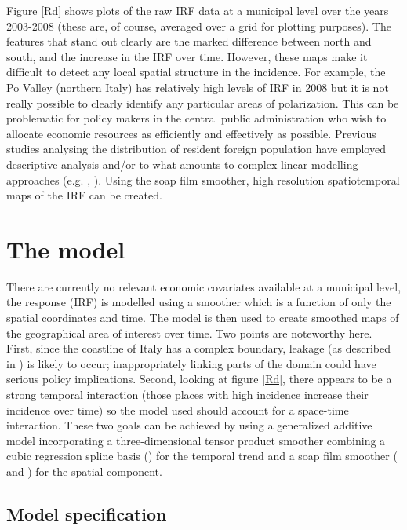 Figure \ref{Rd} shows plots of the raw IRF data at a municipal level over the years 2003-2008 (these are, of course, averaged over a grid for plotting purposes). The features that stand out clearly are the marked difference between north and south, and the increase in the IRF over time. However, these maps make it difficult to detect any local spatial structure in the incidence. For example, the Po Valley (northern Italy) has relatively high levels of IRF in 2008 but it is not really possible to clearly identify any particular areas of polarization. This can be problematic for policy makers in the central public administration who wish to allocate economic resources as efficiently and effectively as possible. Previous studies analysing the distribution of resident foreign population have employed descriptive analysis and/or to what amounts  to complex linear modelling approaches (e.g. \cite{Fonseca2008}, \cite{Longhi2010}). Using the soap film smoother, high resolution spatiotemporal maps of the IRF can be created.


\section{The model \label{METH}}

There are currently no relevant economic covariates available at a municipal level, the response (IRF) is modelled using a smoother which is a function of only the spatial coordinates and time. The model is then used to create smoothed maps of the geographical area of interest over time. Two points are noteworthy here. First, since the coastline of Italy has a complex boundary, leakage (as described in ) is likely to occur; inappropriately linking parts of the domain could have serious policy implications. Second, looking at figure \ref{Rd}, there appears to be a strong temporal interaction (those places with high incidence increase their incidence over time) so the model used should account for a space-time interaction. These two goals can be achieved by using a generalized additive model incorporating a three-dimensional tensor product smoother combining a cubic regression spline basis () for the temporal trend and a soap film smoother (\cite{soap} and ) for the spatial component.

\subsection{Model specification \label{MS}}

